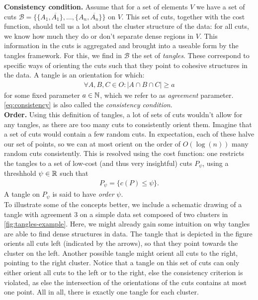 \noindent
\textbf{Consistency condition.} Assume that for a set of elements $V$ we have a set of cuts $\mathcal{B} = \{\{A_1, \overline{A_1}\}, \ldots, \{A_n, \overline{A_n}\} \} $ on $V$.
This set of cuts, together with the cost function, should tell us a lot about the cluster structure of the data:
for all cuts, we know how much they do or don't separate dense regions in $V$. 
This information in the cuts is aggregated and brought into a useable form by the tangles framework. 
For this, we find in $\mathcal{B}$ the set of \textit{tangles}.  
These correspond to specific ways of orienting the cuts such that they point to cohesive structures in the data.  
A tangle is an orientation for which:
\begin{align}\label{eq:consistency}
    \forall A,B,C \in O: \left| A \cap B \cap C \right| \ge a
\end{align}
for some fixed parameter $a \in \mathbb{N}$, which we refer to as \textit{agreement} parameter. \autoref{eq:consistency} is also called the \textit{consistency condition}. \\

\noindent
\textbf{Order.} Using this definition of tangles, a lot of sets of cuts wouldn't allow for any tangles, as there are too many cuts to consistently orient them. 
Imagine that a set of cuts would contain a few random cuts. 
In expectation, each of these halve our set of points, so we can at most orient on the order of $O(\log(n))$ many random cuts consistently.
This is resolved using the cost function: one restricts the tangles to a set of low-cost (and thus very insightful) cuts $P_{\psi}$, using a threshhold $\psi \in \mathbb{R}$ such that
\begin{align*}
P_{\psi} = \{ c(P) \le \psi \}   
.\end{align*}
A tangle on $P_{\psi}$ is said to have \textit{order} $\psi$. \\

\noindent
To illustrate some of the concepts better, we include a schematic drawing of a tangle with agreement $3$ on 
a simple data set composed of two clusters in \autoref{fig:tangles-example}. 
Here, we might already gain some intuition on why tangles are able to find dense structures in data. 
The tangle that is depicted in the figure orients all cuts left 
(indicated by the arrows), so that they point towards the cluster on the left. 
Another possible tangle might orient all cuts to the right, pointing to the right cluster. 
Notice that a tangle on this set of cuts can only either orient all cuts to the left or to the 
right, else the consistency criterion is violated, as else the intersection of the orientations of the cuts contains at most one point. 
All in all, 
there is exactly one tangle for each cluster.

